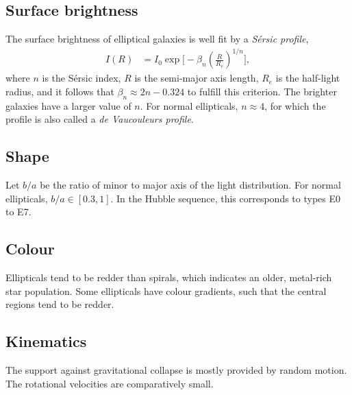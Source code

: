 \subsection{Surface brightness}
The surface brightness of elliptical galaxies is well fit by a \emph{Sérsic profile},
\begin{align*}
	I(R)
	&= I_0 \exp\Bigg[ - \beta_n \left( \frac{R}{R_e}  \right)^{1/n} \Bigg],
\end{align*}
where $n$ is the Sérsic index,
$R$ is the semi-major axis length,
$R_e$ is the half-light radius,
and it follows that $\beta_n \approx 2 n - 0.324$ to fulfill this criterion.
The brighter galaxies have a larger value of $n$.
For normal ellipticals, $n \approx 4$, for which the profile is also called a \emph{de Vaucouleurs profile}.

\subsection{Shape}
Let $b/a$ be the ratio of minor to major axis of the light distribution.
For normal ellipticals, $b/a \in [0.3, 1]$.
In the Hubble sequence, this corresponds to types E0 to E7.

\subsection{Colour}
Ellipticals tend to be redder than spirals, which indicates an older, metal-rich star population.
Some ellipticals have colour gradients, such that the central regions tend to be redder.

\subsection{Kinematics}
The support against gravitational collapse is mostly provided by random motion.
The rotational velocities are comparatively small.


